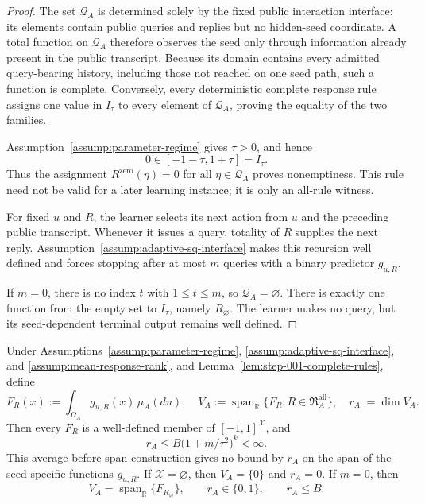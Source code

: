 \begin{proof}
The set \(\mathscr Q_A\) is determined solely by the fixed public interaction
interface: its elements contain public queries and replies but no hidden-seed
coordinate.  A total function on \(\mathscr Q_A\) therefore observes the seed
only through information already present in the public transcript.  Because
its domain contains every admitted query-bearing history, including those not
reached on one seed path, such a function is complete.  Conversely, every
deterministic complete response rule assigns one value in \(I_\tau\) to every
element of \(\mathscr Q_A\), proving the equality of the two families.

Assumption~\ref{assump:parameter-regime} gives \(\tau>0\), and hence
\[
0\in[-1-\tau,1+\tau]=I_\tau.
\]
Thus the assignment \(R^{\mathrm{zero}}(\eta)=0\) for all
\(\eta\in\mathscr Q_A\) proves nonemptiness.  This rule need not be valid for
a later learning instance; it is only an all-rule witness.

For fixed \(u\) and \(R\), the learner selects its next action from \(u\) and
the preceding public transcript.  Whenever it issues a query, totality of
\(R\) supplies the next reply.  Assumption~\ref{assump:adaptive-sq-interface}
makes this recursion well defined and forces stopping after at most \(m\)
queries with a binary predictor \(g_{u,R}\).

If \(m=0\), there is no index \(t\) with \(1\le t\le m\), so
\(\mathscr Q_A=\varnothing\).  There is exactly one function from the empty
set to \(I_\tau\), namely \(R_\varnothing\).  The learner makes no query, but
its seed-dependent terminal output remains well defined.
\end{proof}

\begin{proposition}
\label{prop:step-001-mean-response-space}
Under Assumptions~\ref{assump:parameter-regime},
\ref{assump:adaptive-sq-interface}, and
\ref{assump:mean-response-rank}, and Lemma~\ref{lem:step-001-complete-rules},
define
\[
F_R(x):=\int_{\Omega_A}g_{u,R}(x)\,\mu_A(du),
\quad
V_A:=\operatorname{span}_{\mathbb R}
\{F_R:R\in\mathfrak R_A^{\mathrm{all}}\},
\quad
r_A:=\dim V_A.
\]
Then every \(F_R\) is a well-defined member of
\([-1,1]^{\mathcal X}\), and
\[
r_A\le B\bigl(1+m/\tau^2\bigr)^k<\infty.
\]
This average-before-span construction gives no bound by \(r_A\) on the span
of the seed-specific functions \(g_{u,R}\).  If
\(\mathcal X=\varnothing\), then \(V_A=\{0\}\) and \(r_A=0\).  If
\(m=0\), then
\[
V_A=\operatorname{span}_{\mathbb R}\{F_{R_\varnothing}\},
\qquad r_A\in\{0,1\},
\qquad r_A\le B.
\]
\end{proposition}

